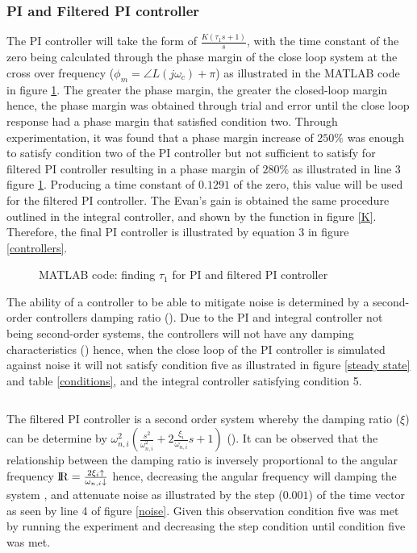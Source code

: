 \documentclass[
	12pt, %
]{fphw}
\begin{document}
\subsubsection{PI and Filtered PI controller}
The PI controller will take the form of  $\frac{K(\tau_{1}s + 1)}{s}$, with the time constant of the zero being calculated through the phase margin of the close loop system at the cross over frequency ($ \phi_{m} = \angle L(j \omega_{c}) + \pi$) as illustrated in the MATLAB code in figure \ref{t1}. The greater the phase margin, the greater the closed-loop margin hence, the phase margin was obtained through trial and error until the close loop response had a phase margin that satisfied condition two. Through experimentation, it was found that a phase margin increase of $250\%$ was enough to satisfy condition two of the PI controller but not sufficient to satisfy for filtered PI controller resulting in a phase margin of $280\%$ as illustrated in line 3 figure \ref{t1}. Producing a time constant of $0.1291$ of the zero, this value will be used for the filtered PI controller. The Evan's gain is obtained the same procedure outlined in the integral controller, and shown by the function in figure \ref{K}. Therefore, the final PI controller is illustrated by equation 3 in figure \ref{controllers}.\par
\begin{figure}[htp]
    
    \caption{MATLAB code: finding $\tau_{1}$ for PI and filtered PI controller}
    \label{t1}
\end{figure}

The ability of a controller to be able to mitigate noise is determined by a second-order controllers damping ratio (\cite{WANG2013459}). Due to the PI and integral controller not being second-order systems, the controllers will not have any damping characteristics (\cite{lec4_systems}) hence, when the close loop of the PI controller is simulated against noise it will not satisfy condition five as illustrated in figure \ref{steady state} and table \ref{conditions}, and the integral controller satisfying condition 5.\par $ $%

 The filtered PI controller is a second order system whereby the damping ratio ($\xi$) can be determine by $\omega_{n,i}^{2} (\frac{s^{2}}{\omega_{n,i}^{2}} + 2 \frac{\xi_{i}}{\omega_{n,i}} s + 1)$ (\cite{LTI}). It can be observed that the relationship between the damping ratio is inversely proportional to the angular frequency ${\rm I\!R} = \frac{2 \xi_{i} \uparrow}{\omega_{n,i} \downarrow}$ hence, decreasing the angular frequency will damping the system , and attenuate noise as illustrated by the step ($0.001$) of the time vector as seen by line 4 of figure \ref{noise}. Given this observation condition five was met by running the experiment and decreasing the step condition until condition five was met.
\end{document}

